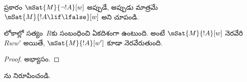 \documentclass[../../../include/open-logic-section]{subfiles}
\begin{document}
\begin{prob}
   ప్రకారం
  $\mSat{M}{\lnot !A}[w]$ అప్పుడే, అప్పుడు మాత్రమే
  $\mSat{M}{!A \lif \lfalse}[w]$ అని చూపండి.
\end{prob}

\begin{prop}
  లోకాల్లో సత్యం~$R$కు సంబంధించి ఏకదిశంగా ఉంటుంది.
  అంటే $\mSat{M}{!A}[w]$ నెరవేరి $Rww'$ అయితే,
  $\mSat{M}{!A}[w']$ కూడా నెరవేరుతుంది.
\end{prop}

\begin{proof}
  అభ్యాసం.
\end{proof}

\begin{prob}
  ను నిరూపించండి.
\end{prob}
\end{document}
